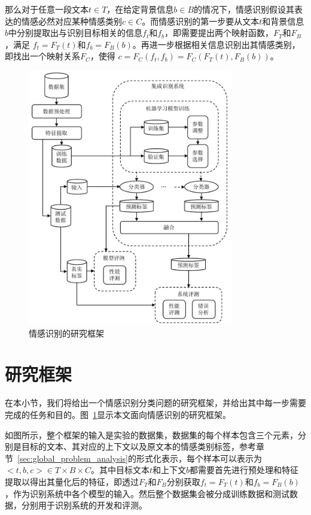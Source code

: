 那么对于任意一段文本$t \in T$，在给定背景信息$b \in B$的情况下，情感识别假设其表达的情感必然对应某种情感类别$c \in C$。而情感识别的第一步要从文本$t$和背景信息$b$中分别提取出与识别目标相关的信息$f_t$和$f_b$，即需要提出两个映射函数，$F_T$和$F_B$，满足 $f_t=F_T(t)$和$f_b=F_B(b)$。再进一步根据相关信息识别出其情感类别，即找出一个映射关系$F_C$，使得 $c=F_C(f_t, f_b)=F_C(F_T(t), F_B(b))$。

\begin{figure}[H]
  \centering
  \includegraphics[width=0.8\textwidth]{img/framework_v2.pdf}
  \caption{情感识别的研究框架}
  \label{fig:framework}
\end{figure}

\section{研究框架}
\label{sec:global_framework}

在本小节，我们将给出一个情感识别分类问题的研究框架，并给出其中每一步需要完成的任务和目的。图~\ref{fig:framework}显示本文面向情感识别的研究框架。

如图所示，整个框架的输入是实验的数据集，数据集的每个样本包含三个元素，分别是目标的文本、其对应的上下文以及原文本的情感类别标签，参考章节~\ref{sec:global_problem_analysis}的形式化表示，每个样本可以表示为 $<t, b, c> \in T \times B \times C$。其中目标文本$t$和上下文$b$都需要首先进行预处理和特征提取以得出其量化后的特征，即透过$F_T$和$F_B$分别获取$f_t=F_T(t)$和$f_b=F_B(b)$，作为识别系统中各个模型的输入。然后整个数据集会被分成训练数据和测试数据，分别用于识别系统的开发和评测。

